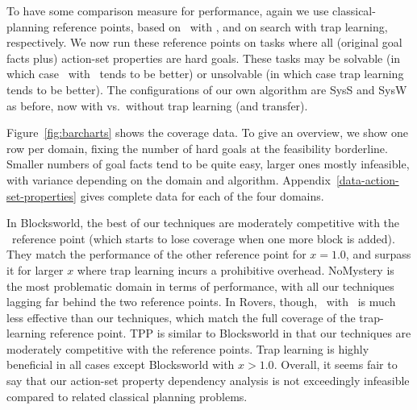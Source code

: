 To have some comparison measure for performance, again we use
classical-planning reference points, based on \astar\ with \hlmcut,
and on search with trap learning, respectively. We now run these
reference points on tasks where all (original goal facts plus)
action-set properties are hard goals. These tasks may be solvable (in
which case \astar\ with \hlmcut\ tends to be better) or unsolvable (in
which case trap learning tends to be better). The configurations of
our own algorithm are SysS and SysW as before, now with vs.\ without
trap learning (and transfer).

Figure~\ref{fig:barcharts} shows the coverage data. To give an
overview, we show one row per domain, fixing the number of hard goals
at the feasibility borderline. Smaller numbers of goal facts tend to
be quite easy, larger ones mostly infeasible, with variance depending
on the domain and algorithm.
Appendix~\ref{data-action-set-properties} gives complete data for each
of the four domains.

In Blocksworld, the best of our techniques are moderately competitive
with the \hlmcut\ reference point (which starts to lose coverage when
one more block is added). They match the performance of the other
reference point for $x=1.0$, and surpass it for larger $x$ where trap
learning incurs a prohibitive overhead. NoMystery is the most
problematic domain in terms of performance, with all our techniques
lagging far behind the two reference points. In Rovers,
though, \astar\ with \hlmcut\ is much less effective than our
techniques, which match the full coverage of the trap-learning
reference point. TPP is similar to Blocksworld in that our techniques
are moderately competitive with the reference points. 
Trap learning is highly
beneficial in all cases except Blocksworld with $x>1.0$. Overall, it
seems fair to say that our action-set property dependency analysis is
not exceedingly infeasible compared to related classical planning
problems.


\fi






























